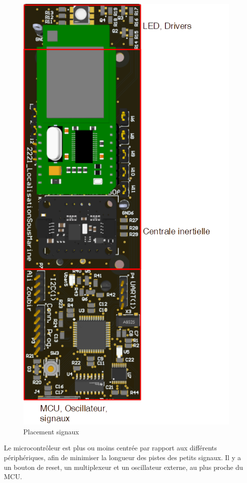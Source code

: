{\begin{figure}[h]
	\centering
	\includegraphics[width=0.56\linewidth]{Figures/hautPCB}
	\caption{Placement signaux}
	\label{fig:hautpcb}
\end{figure}

Le microcontrôleur est plus ou moins centrée par rapport aux différents périphériques, afin de minimiser la longueur des pistes des petits signaux. Il y a un bouton de reset, un multiplexeur et un oscillateur externe, au plus proche du MCU.
}
\clearpage

